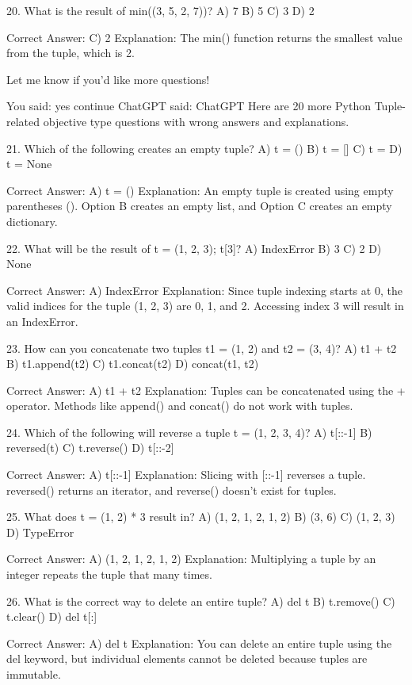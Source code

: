 20. What is the result of min((3, 5, 2, 7))?
A) 7
B) 5
C) 3
D) 2

Correct Answer: C) 2
Explanation: The min() function returns the smallest value from the tuple, which is 2.

Let me know if you'd like more questions!






You said:
yes continue
ChatGPT said:
ChatGPT
Here are 20 more Python Tuple-related objective type questions with wrong answers and explanations.

21. Which of the following creates an empty tuple?
A) t = ()
B) t = []
C) t = {}
D) t = None

Correct Answer: A) t = ()
Explanation: An empty tuple is created using empty parentheses (). Option B creates an empty list, and Option C creates an empty dictionary.

22. What will be the result of t = (1, 2, 3); t[3]?
A) IndexError
B) 3
C) 2
D) None

Correct Answer: A) IndexError
Explanation: Since tuple indexing starts at 0, the valid indices for the tuple (1, 2, 3) are 0, 1, and 2. Accessing index 3 will result in an IndexError.

23. How can you concatenate two tuples t1 = (1, 2) and t2 = (3, 4)?
A) t1 + t2
B) t1.append(t2)
C) t1.concat(t2)
D) concat(t1, t2)

Correct Answer: A) t1 + t2
Explanation: Tuples can be concatenated using the + operator. Methods like append() and concat() do not work with tuples.

24. Which of the following will reverse a tuple t = (1, 2, 3, 4)?
A) t[::-1]
B) reversed(t)
C) t.reverse()
D) t[::-2]

Correct Answer: A) t[::-1]
Explanation: Slicing with [::-1] reverses a tuple. reversed() returns an iterator, and reverse() doesn't exist for tuples.

25. What does t = (1, 2) * 3 result in?
A) (1, 2, 1, 2, 1, 2)
B) (3, 6)
C) (1, 2, 3)
D) TypeError

Correct Answer: A) (1, 2, 1, 2, 1, 2)
Explanation: Multiplying a tuple by an integer repeats the tuple that many times.

26. What is the correct way to delete an entire tuple?
A) del t
B) t.remove()
C) t.clear()
D) del t[:]

Correct Answer: A) del t
Explanation: You can delete an entire tuple using the del keyword, but individual elements cannot be deleted because tuples are immutable.


